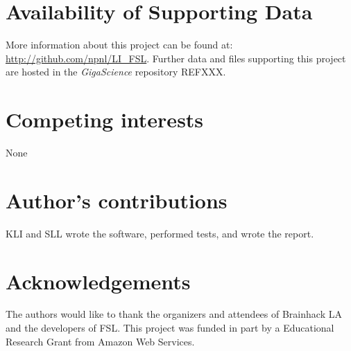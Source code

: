 \documentclass[twocolumn]{bmcart}%
\begin{document}
\begin{backmatter}

\section*{Availability of Supporting Data}
More information about this project can be found at: \url{http://github.com/npnl/LI\_FSL}. Further data and files supporting this project are hosted in the \emph{GigaScience} repository REFXXX.

\section*{Competing interests}
None

\section*{Author's contributions}
KLI and SLL wrote the software, performed tests, and wrote the report.

\section*{Acknowledgements}
The authors would like to thank the organizers and attendees of
Brainhack LA and the developers of FSL. This project was funded in part
by a Educational Research Grant from Amazon Web Services.

  
  


\end{backmatter}
\end{document}
